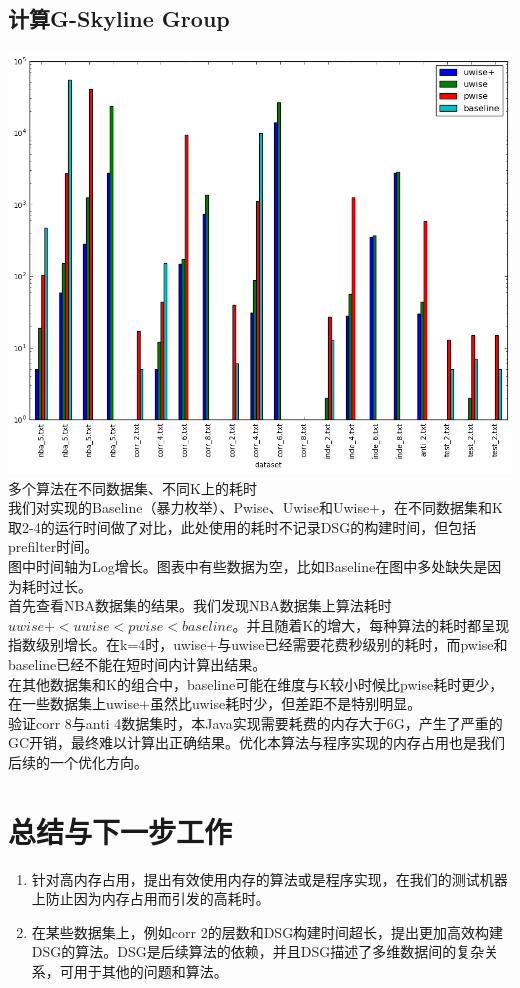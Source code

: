\documentclass{article}
\begin{document}
\begin{CJK}{UTF8}{gbsn}
\subsection{计算G-Skyline Group}

\includegraphics[scale=0.4]{pics/eval_4_algo_on_multi_dataset.png}
\\多个算法在不同数据集、不同K上的耗时\\
我们对实现的Baseline（暴力枚举）、Pwise、Uwise和Uwise+，在不同数据集和K取2-4的运行时间做了对比，此处使用的耗时不记录DSG的构建时间，但包括prefilter时间。\\
图中时间轴为Log增长。图表中有些数据为空，比如Baseline在图中多处缺失是因为耗时过长。\\
首先查看NBA数据集的结果。我们发现NBA数据集上算法耗时$uwise+ < uwise < pwise < baseline$。并且随着K的增大，每种算法的耗时都呈现指数级别增长。在k=4时，uwise+与uwise已经需要花费秒级别的耗时，而pwise和baseline已经不能在短时间内计算出结果。\\
在其他数据集和K的组合中，baseline可能在维度与K较小时候比pwise耗时更少，在一些数据集上uwise+虽然比uwise耗时少，但差距不是特别明显。\\
验证corr 8与anti 4数据集时，本Java实现需要耗费的内存大于6G，产生了严重的GC开销，最终难以计算出正确结果。优化本算法与程序实现的内存占用也是我们后续的一个优化方向。

\section{总结与下一步工作}
\begin{enumerate}
	\item 针对高内存占用，提出有效使用内存的算法或是程序实现，在我们的测试机器上防止因为内存占用而引发的高耗时。
	\item 在某些数据集上，例如corr 2的层数和DSG构建时间超长，提出更加高效构建DSG的算法。DSG是后续算法的依赖，并且DSG描述了多维数据间的复杂关系，可用于其他的问题和算法。
\end{enumerate}


\end{CJK}
\end{document}
